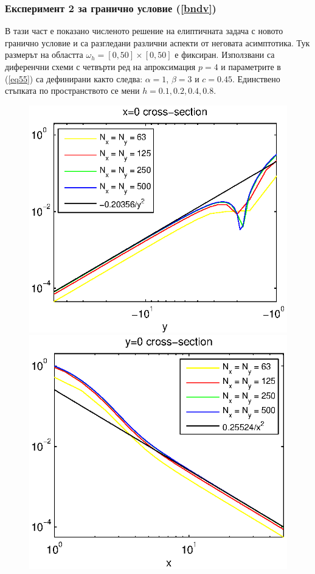 \documentclass[a4paper]{article}
\newcommand{\rf}[1]{(\ref{#1})}
\theoremstyle{remark}
\begin{document}
\begin{large}
\subsubsection{Експеримент 2 за гранично условие \rf{bndv}}
В тази част е показано численото решение на елиптичната задача с новото гранично условие и са разгледани различни аспекти от неговата асимптотика. Тук размерът на областта $\omega_h = [0, 50] \times [0, 50]$ е фиксиран. Използвани са диференчни схеми с четвърти ред на апроксимация $p=4$ и параметрите в \rf{eq55} са дефинирани както следва: $\alpha = 1$, $\beta = 3$ и $c=0.45$. Единствено стъпката по пространството се мени $h=0.1, 0.2, 0.4, 0.8$.
\begin{figure}[ht]
	\begin{minipage}[b]{0.5\linewidth}
		\raggedleft
		\includegraphics[width=\linewidth]{NewBoundaryCondition/crossSectionLogX=0.eps}
	\end{minipage}	
	\begin{minipage}[b]{0.5\linewidth}
		\raggedright
		 \includegraphics[width=\linewidth]{NewBoundaryCondition/crossSectionLogY=0.eps}

\end{minipage}
\end{figure}
\end{large}
\end{document}
